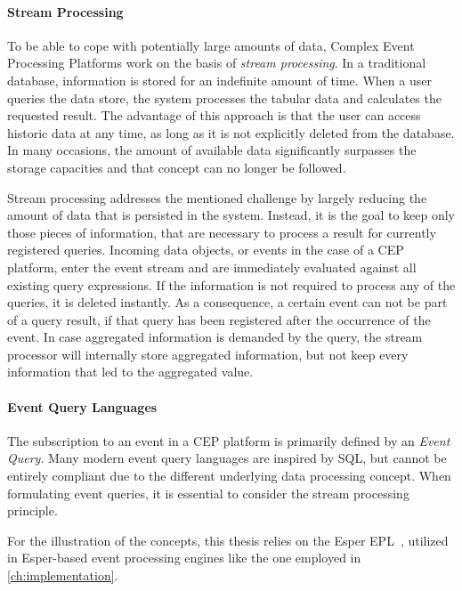 \paragraph{Stream Processing}
To be able to cope with potentially large amounts of data, Complex Event Processing Platforms work on the basis of \textit{stream processing}.
In a traditional database, information is stored for an indefinite amount of time. When a user queries the data store, the system processes the tabular data and calculates the requested result. 
The advantage of this approach is that the user can access historic data at any time, as long as it is not explicitly deleted from the database.
In many occasions, the amount of available data significantly surpasses the storage capacities and that concept can no longer be followed.

Stream processing addresses the mentioned challenge by largely reducing the amount of data that is persisted in the system. Instead, it is the goal to keep only those pieces of information, that are necessary to process a result for currently registered queries.
Incoming data objects, or events in the case of a CEP platform, enter the event stream and are immediately evaluated against all existing query expressions. If the information is not required to process any of the queries, it is deleted instantly.
As a consequence, a certain event can not be part of a query result, if that query has been registered after the occurrence of the event.
In case aggregated information is demanded by the query, the stream processor will internally store aggregated information, but not keep every information that led to the aggregated value.~\cite{streamprocessing} 


\paragraph{Event Query Languages}
The subscription to an event in a CEP platform is primarily defined by an \textit{Event Query}.
Many modern event query languages are inspired by \acs{SQL}, but cannot be entirely compliant due to the different underlying data processing concept.
When formulating event queries, it is essential to consider the stream processing principle.

For the illustration of the concepts, this thesis relies on the Esper \ac{EPL}~\cite{esperhome}, utilized in Esper-based event processing engines like the one employed in \autoref{ch:implementation}.

